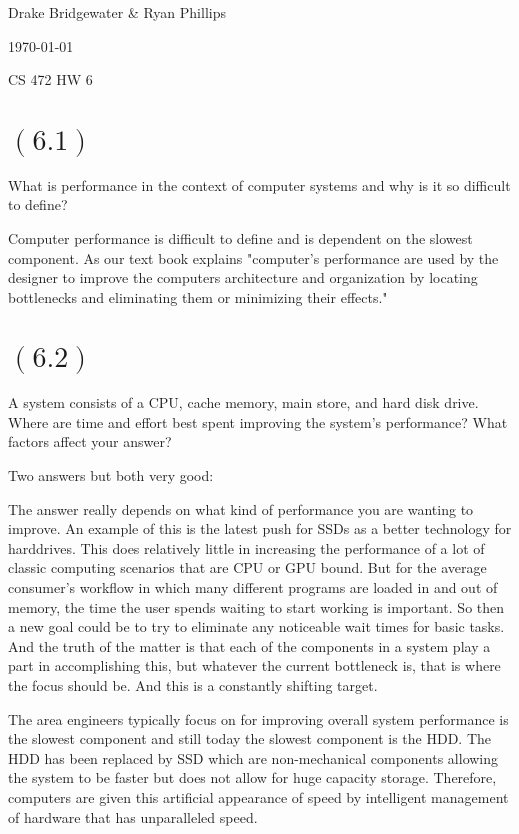 \documentclass[letterpaper,12pt,titlepage]{article}
\def\name{Drake Bridgewater \& Ryan Phillips}
\begin{document}
\hfill \name

\hfill \today

\hfill CS 472 HW 6

\section*{$(6.1)$} What is performance in the context of computer systems and why is it so difficult to define?

\begin{mdframed}[style=MyFrame]
Computer performance is difficult to define and is dependent on the slowest component. As our text book explains "computer's performance are used by the designer to improve the computers architecture and organization by locating bottlenecks and eliminating them or minimizing their effects." \cite{Clements}
\end{mdframed}

\section*{$(6.2)$} A system consists of a CPU, cache memory, main store, and hard disk drive. Where are time and effort best spent improving the system's performance? What factors affect your answer?

\begin{mdframed}[style=MyFrame]
Two answers but both very good:

The answer really depends on what kind of performance you are wanting to improve. An example of this is the latest push for SSDs as a better technology for harddrives. This does relatively little in increasing the performance of a lot of classic computing scenarios that are CPU or GPU bound. But for the average consumer's workflow in which many different programs are loaded in and out of memory, the time the user spends waiting to start working is important. So then a new goal could be to try to eliminate any noticeable wait times for basic tasks. And the truth of the matter is that each of the components in a system play a part in accomplishing this, but whatever the current bottleneck is, that is where the focus should be. And this is a constantly shifting target.

The area engineers typically focus on for improving overall system performance is the slowest component and still today the slowest component is the HDD. The HDD has been replaced by SSD which are non-mechanical components allowing the system to be faster but does not allow for huge capacity storage. Therefore, computers are given this artificial appearance of speed by intelligent management of hardware that has unparalleled speed.
\end{mdframed}
\end{document}
